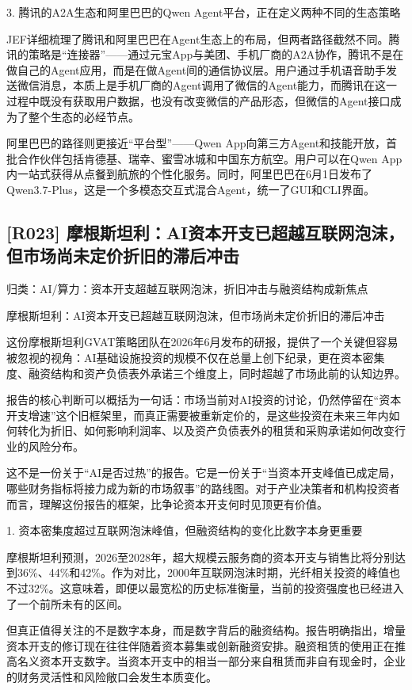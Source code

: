 \documentclass[11pt]{ctexart}
\begin{document}
3. 腾讯的A2A生态和阿里巴巴的Qwen Agent平台，正在定义两种不同的生态策略

JEF详细梳理了腾讯和阿里巴巴在Agent生态上的布局，但两者路径截然不同。腾讯的策略是“连接器”——通过元宝App与美团、手机厂商的A2A协作，腾讯不是在做自己的Agent应用，而是在做Agent间的通信协议层。用户通过手机语音助手发送微信消息，本质上是手机厂商的Agent调用了微信的Agent能力，而腾讯在这一过程中既没有获取用户数据，也没有改变微信的产品形态，但微信的Agent接口成为了整个生态的必经节点。

阿里巴巴的路径则更接近“平台型”——Qwen App向第三方Agent和技能开放，首批合作伙伴包括肯德基、瑞幸、蜜雪冰城和中国东方航空。用户可以在Qwen App内一站式获得从点餐到航旅的个性化服务。同时，阿里巴巴在6月1日发布了Qwen3.7-Plus，这是一个多模态交互式混合Agent，统一了GUI和CLI界面。

\subsection{[R023] 摩根斯坦利：AI资本开支已超越互联网泡沫，但市场尚未定价折旧的滞后冲击}
{\small\color{refgray}归类：AI/算力：资本开支超越互联网泡沫，折旧冲击与融资结构成新焦点}

摩根斯坦利：AI资本开支已超越互联网泡沫，但市场尚未定价折旧的滞后冲击

这份摩根斯坦利GVAT策略团队在2026年6月发布的研报，提供了一个关键但容易被忽视的视角：AI基础设施投资的规模不仅在总量上创下纪录，更在资本密集度、融资结构和资产负债表外承诺三个维度上，同时超越了市场此前的认知边界。

报告的核心判断可以概括为一句话：市场当前对AI投资的讨论，仍然停留在“资本开支增速”这个旧框架里，而真正需要被重新定价的，是这些投资在未来三年内如何转化为折旧、如何影响利润率、以及资产负债表外的租赁和采购承诺如何改变行业的风险分布。

这不是一份关于“AI是否过热”的报告。它是一份关于“当资本开支峰值已成定局，哪些财务指标将接力成为新的市场叙事”的路线图。对于产业决策者和机构投资者而言，理解这份报告的框架，比争论资本开支何时见顶更有价值。

1. 资本密集度超过互联网泡沫峰值，但融资结构的变化比数字本身更重要

摩根斯坦利预测，2026至2028年，超大规模云服务商的资本开支与销售比将分别达到36\%、44\%和42\%。作为对比，2000年互联网泡沫时期，光纤相关投资的峰值也不过32\%。这意味着，即便以最宽松的历史标准衡量，当前的投资强度也已经进入了一个前所未有的区间。

但真正值得关注的不是数字本身，而是数字背后的融资结构。报告明确指出，增量资本开支的修订现在往往伴随着资本募集或创新融资安排。融资租赁的使用正在推高名义资本开支数字。当资本开支中的相当一部分来自租赁而非自有现金时，企业的财务灵活性和风险敞口会发生本质变化。
\end{document}
